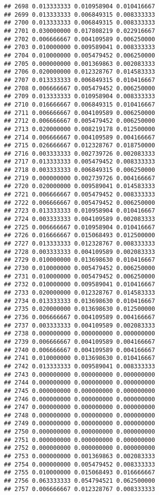 \documentclass[
]{article}
\begin{document}
\begin{verbatim}
## 2698 0.013333333 0.010958904 0.010416667
## 2699 0.013333333 0.006849315 0.008333333
## 2700 0.013333333 0.006849315 0.008333333
## 2701 0.030000000 0.017808219 0.022916667
## 2702 0.006666667 0.004109589 0.006250000
## 2703 0.010000000 0.009589041 0.008333333
## 2704 0.010000000 0.005479452 0.006250000
## 2705 0.000000000 0.001369863 0.002083333
## 2706 0.020000000 0.012328767 0.014583333
## 2707 0.013333333 0.006849315 0.010416667
## 2708 0.006666667 0.005479452 0.006250000
## 2709 0.013333333 0.010958904 0.008333333
## 2710 0.016666667 0.006849315 0.010416667
## 2711 0.006666667 0.004109589 0.006250000
## 2712 0.006666667 0.005479452 0.006250000
## 2713 0.020000000 0.008219178 0.012500000
## 2714 0.006666667 0.004109589 0.004166667
## 2715 0.026666667 0.012328767 0.018750000
## 2716 0.003333333 0.002739726 0.002083333
## 2717 0.013333333 0.005479452 0.008333333
## 2718 0.003333333 0.006849315 0.006250000
## 2719 0.000000000 0.002739726 0.004166667
## 2720 0.020000000 0.009589041 0.014583333
## 2721 0.006666667 0.005479452 0.008333333
## 2722 0.006666667 0.005479452 0.006250000
## 2723 0.013333333 0.010958904 0.010416667
## 2724 0.003333333 0.004109589 0.002083333
## 2725 0.006666667 0.010958904 0.010416667
## 2726 0.016666667 0.015068493 0.012500000
## 2727 0.013333333 0.012328767 0.008333333
## 2728 0.003333333 0.004109589 0.002083333
## 2729 0.010000000 0.013698630 0.010416667
## 2730 0.010000000 0.005479452 0.006250000
## 2731 0.010000000 0.005479452 0.006250000
## 2732 0.010000000 0.009589041 0.010416667
## 2733 0.020000000 0.012328767 0.014583333
## 2734 0.013333333 0.013698630 0.010416667
## 2735 0.020000000 0.013698630 0.012500000
## 2736 0.006666667 0.004109589 0.004166667
## 2737 0.003333333 0.004109589 0.002083333
## 2738 0.000000000 0.000000000 0.000000000
## 2739 0.006666667 0.004109589 0.004166667
## 2740 0.006666667 0.004109589 0.004166667
## 2741 0.010000000 0.013698630 0.010416667
## 2742 0.013333333 0.009589041 0.008333333
## 2743 0.000000000 0.000000000 0.000000000
## 2744 0.000000000 0.000000000 0.000000000
## 2745 0.000000000 0.000000000 0.000000000
## 2746 0.000000000 0.000000000 0.000000000
## 2747 0.000000000 0.000000000 0.000000000
## 2748 0.000000000 0.000000000 0.000000000
## 2749 0.000000000 0.000000000 0.000000000
## 2750 0.000000000 0.000000000 0.000000000
## 2751 0.000000000 0.000000000 0.000000000
## 2752 0.000000000 0.000000000 0.000000000
## 2753 0.000000000 0.001369863 0.002083333
## 2754 0.000000000 0.005479452 0.008333333
## 2755 0.010000000 0.015068493 0.016666667
## 2756 0.063333333 0.054794521 0.062500000
## 2757 0.006666667 0.012328767 0.008333333

\end{verbatim}
\end{document}
